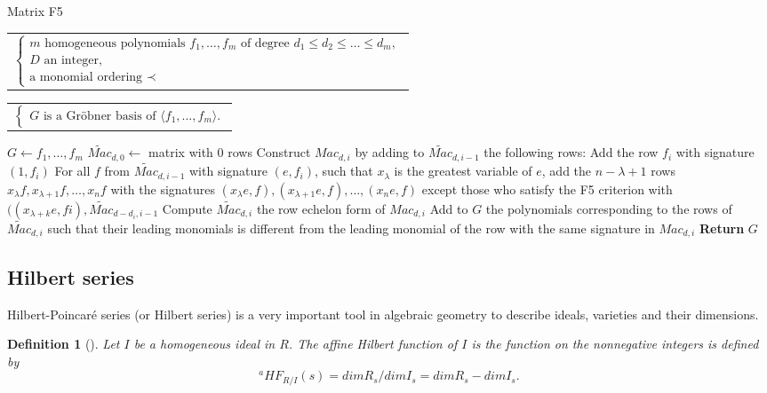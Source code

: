 \documentclass[english]{article}
\newtheorem{definition}{Definition}[section]
\begin{document}
		\begin{algorithm}
			\caption{Matrix F5}\label{alg:matrix_f5}
			\begin{algorithmic}[1]
				\Require 
				\begin{tabular}[t]{@{}l@{}}
					$\left\{ 
					\begin{array}{l}
						m \text{ homogeneous polynomials } f_1, \dots, f_m \text{ of degree } d_1 \leq d_2 \leq \dots \leq d_m, \\
						D \text{ an integer}, \\
						\text{a monomial ordering } \prec
					\end{array}
					\right.$
				\end{tabular}
				\Ensure 
				\begin{tabular}[t]{@{}l@{}}
					$\left\{ 
					\begin{array}{l}
						G \text{ is a Gröbner basis of } \langle f_1,\dots,f_m \rangle.
					\end{array}
					\right.$
				\end{tabular}
				\State $G \gets {f_1,\dots,f_m}$
					\State $\widetilde{Mac}_{d, 0} \gets$ matrix with 0 rows
						\State Construct ${Mac}_{d, i}$ by adding to $\widetilde{Mac}_{d, i-1}$ the following rows:
							\State Add the row $f_i$ with signature $(1, f_i)$
						\EndIf
							For all $f$ from $\widetilde{Mac}_{d, i-1}$ with signature $(e, f_i)$, such that $x_\lambda$ is the greatest variable of $e$, add the $n - \lambda + 1$ rows $x_\lambda f,x_{\lambda + 1}f,\dots,x_n f$ with the signatures $(x_\lambda e, f),(x_{\lambda + 1}e, f),\dots,(x_n e, f)$ except those who satisfy the F5 criterion with $((x_{\lambda + k}e, fi), \widetilde{Mac}_{d-d_i, i-1}$
						\EndIf
						\State Compute $\widetilde{Mac}_{d, i}$ the row echelon form of ${Mac}_{d, i}$
						\State Add to $G$ the polynomials corresponding to the rows of $\widetilde{Mac}_{d, i}$ such that their leading
						\State monomials is different from the leading monomial of the row with the
						\State same signature in ${Mac}_{d, i}$
				 	\EndFor
				\EndFor
				\State \textbf{Return} $G$
			\end{algorithmic}
		\end{algorithm}
		
		\subsection{Hilbert series}
		Hilbert-Poincaré series (or Hilbert series) is a very important tool in algebraic geometry to describe ideals, varieties and their dimensions.
		\begin{definition}[\cite{CLS}]
			Let $I$ be a homogeneous ideal in $R$. The affine Hilbert function of $I$ is the function on the nonnegative integers is defined by
			$$
				{}^a HF_{R/I}(s) = dim R_{s} / dim I_{s} = dim R_{s} - dim I_{s}.
			$$
		\end{definition}
		
\end{document}
